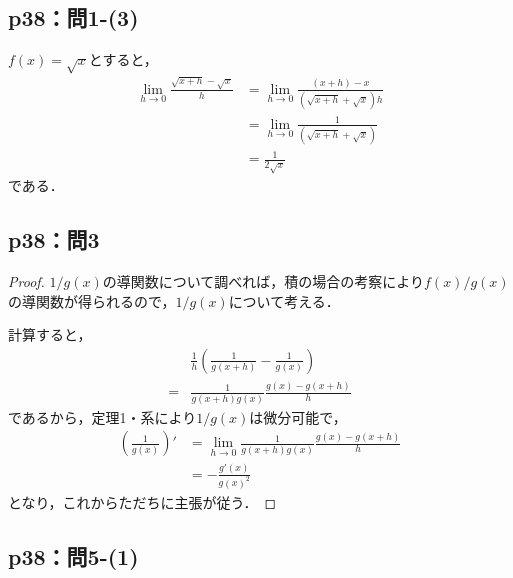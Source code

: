 \documentclass[uplatex,dvipdfmx,a4paper,10pt,fleqn]{jsarticle}
\newenvironment{tleftbar}{\begin{tbleftline}\setlength{\parindent}{1zw}}{\end{tbleftline}}
\begin{document}
\subsection*{p38：問1-(3)}

\begin{tleftbar}
    $f(x)= \sqrt{x}$とすると，
    \begin{align*} 
        \lim_{h \to 0} \frac{\sqrt{x+h}-\sqrt{x}}{h} & = \lim_{h \to 0} \frac{(x+h)-x}{(\sqrt{x+h}+\sqrt{x})h} \\
        & =  \lim_{h \to 0} \frac{1}{(\sqrt{x+h}+\sqrt{x})} \\
        & = \frac{1}{2\sqrt{x}}
    \end{align*} 
    である．
\end{tleftbar}


\subsection*{p38：問3}

\begin{tleftbar}
    \begin{proof}
        $1 /g(x)$の導関数について調べれば，積の場合の考察により$ f(x)/g(x)$の導関数が得られるので，$1/g(x)$について考える．

        計算すると，
        \begin{align*} 
           & \frac{1}{h} \left (\frac{1}{g(x+h)}-\frac{1}{g(x)} \right) \\
           =& \frac{1}{g(x+h)g(x)} \frac{g(x)-g(x+h)}{h}
        \end{align*} 
        であるから，定理1・系により$ 1/g(x)$は微分可能で，
        \begin{align*}
            \left ( \frac{1}{g(x)} \right) ' &= \lim_{h \to 0} \frac{1}{g(x+h)g(x)} \frac{g(x)-g(x+h)}{h} \\
            & = -\frac{g'(x)}{{g(x)}^2}
        \end{align*}
        となり，これからただちに主張が従う．
    \end{proof}
\end{tleftbar}

\subsection*{p38：問5-(1)}
\end{document}
